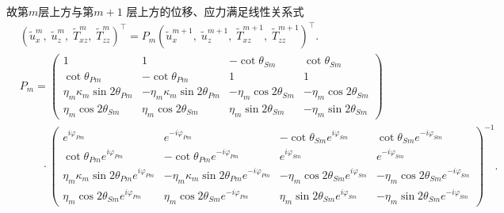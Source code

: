 故第\(m\)层上方与第\(m + 1\) 层上方的位移、应力满足线性关系式
\begin{align*}
	&\left( \tilde{u}_x^m,\; \tilde{u}_z^m,\; \tilde{T}_{xz}^m,\; \tilde{T}_{zz}^m \right)^\top = P_m \left( \tilde{u}_x^{m+1},\; \tilde{u}_z^{m+1},\; \tilde{T}_{xz}^{m+1},\; \tilde{T}_{zz}^{m+1} \right)^\top.\\
	&P_m = \begin{pmatrix}
		1                                & 1                                 & -\cot\theta_{Sm}         & \cot\theta_{Sm}          \\
		\cot\theta_{Pm}                  & -\cot\theta_{Pm}                  & 1                        & 1                        \\
		\eta_m \kappa_m \sin2\theta_{Pm} & -\eta_m \kappa_m \sin2\theta_{Pm} & -\eta_m \cos2\theta_{Sm} & -\eta_m \cos2\theta_{Sm} \\
		\eta_m \cos2\theta_{Sm}          & \eta_m \cos2\theta_{Sm}           & \eta_m \sin2\theta_{Sm}  & -\eta_m \sin2\theta_{Sm}
	\end{pmatrix} \\
	&\qquad \cdot \begin{pmatrix}
		e^{i\varphi_{Pm}}                                  & e^{-i\varphi_{Pm}}                                   & -\cot\theta_{Sm} e^{i\varphi_{Sm}}         & \cot\theta_{Sm} e^{-i\varphi_{Sm}}          \\
		\cot\theta_{Pm} e^{i\varphi_{Pm}}                  & -\cot\theta_{Pm} e^{-i\varphi_{Pm}}                  & e^{i\varphi_{Sm}}                          & e^{-i\varphi_{Sm}}                          \\
		\eta_m \kappa_m \sin2\theta_{Pm} e^{i\varphi_{Pm}} & -\eta_m \kappa_m \sin2\theta_{Pm} e^{-i\varphi_{Pm}} & -\eta_m \cos2\theta_{Sm} e^{i\varphi_{Sm}} & -\eta_m \cos2\theta_{Sm} e^{-i\varphi_{Sm}} \\
		\eta_m \cos2\theta_{Sm} e^{i\varphi_{Pm}}          & \eta_m \cos2\theta_{Sm} e^{-i\varphi_{Pm}}           & \eta_m \sin2\theta_{Sm} e^{i\varphi_{Sm}}  & -\eta_m \sin2\theta_{Sm} e^{-i\varphi_{Sm}}
	\end{pmatrix}^{-1}.
\end{align*}

